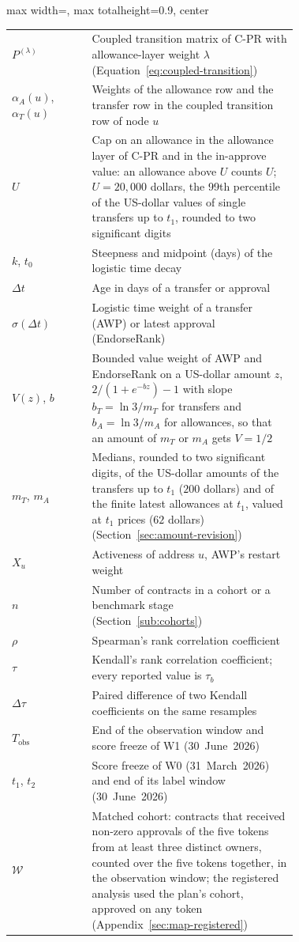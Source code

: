 \begin{table}[htbp]
\begin{adjustbox}{max width=\linewidth, max totalheight=0.9\textheight, center}
\begin{tabular}{lp{0.72\linewidth}}
$P^{(\lambda)}$ & Coupled transition matrix of C-PR with allowance-layer weight $\lambda$ (Equation~\eqref{eq:coupled-transition}) \\
$\alpha_A(u)$, $\alpha_T(u)$ & Weights of the allowance row and the transfer row in the coupled transition row of node $u$ \\
$U$ & Cap on an allowance in the allowance layer of C-PR and in the in-approve value: an allowance above $U$ counts $U$; $U=20{,}000$ dollars, the 99th percentile of the US-dollar values of single transfers up to $t_1$, rounded to two significant digits \\
$k$, $t_0$ & Steepness and midpoint (days) of the logistic time decay \\
$\Delta t$ & Age in days of a transfer or approval \\
$\sigma(\Delta t)$ & Logistic time weight of a transfer (AWP) or latest approval (EndorseRank) \\
$V(z)$, $b$ & Bounded value weight of AWP and EndorseRank on a US-dollar amount $z$, $2/(1+e^{-bz})-1$ with slope $b_T=\ln 3/m_T$ for transfers and $b_A=\ln 3/m_A$ for allowances, so that an amount of $m_T$ or $m_A$ gets $V=1/2$ \\
$m_T$, $m_A$ & Medians, rounded to two significant digits, of the US-dollar amounts of the transfers up to $t_1$ ($200$ dollars) and of the finite latest allowances at $t_1$, valued at $t_1$ prices ($62$ dollars) (Section~\ref{sec:amount-revision}) \\
$X_u$ & Activeness of address $u$, AWP's restart weight \\
$n$ & Number of contracts in a cohort or a benchmark stage (Section~\ref{sub:cohorts}) \\
$\rho$ & Spearman's rank correlation coefficient \\
$\tau$ & Kendall's rank correlation coefficient; every reported value is $\tau_b$ \\
$\Delta\tau$ & Paired difference of two Kendall coefficients on the same resamples \\
$T_{\mathrm{obs}}$ & End of the observation window and score freeze of W1 (30~June~2026) \\
$t_1$, $t_2$ & Score freeze of W0 (31~March~2026) and end of its label window (30~June~2026) \\
$\mathcal{W}$ & Matched cohort: contracts that received non-zero approvals of the five tokens from at least three distinct owners, counted over the five tokens together, in the observation window; the registered analysis used the plan's cohort, approved on any token (Appendix~\ref{sec:map-registered}) \\

\end{tabular}
\end{adjustbox}
\end{table}
